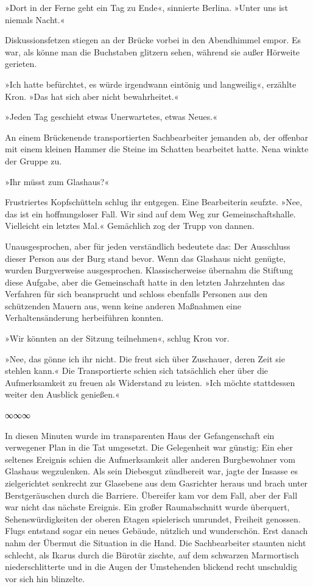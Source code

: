 »Dort in der Ferne geht ein Tag zu Ende«, sinnierte Berlina. »Unter uns ist niemals Nacht.«

Diskussionsfetzen stiegen an der Brücke vorbei in den Abendhimmel empor. Es war, als könne man die Buchstaben glitzern sehen, während sie außer Hörweite gerieten.

»Ich hatte befürchtet, es würde irgendwann eintönig und langweilig«, erzählte Kron. »Das hat sich aber nicht bewahrheitet.«

»Jeden Tag geschieht etwas Unerwartetes, etwas Neues.«

An einem Brückenende transportierten Sachbearbeiter jemanden ab, der offenbar mit einem kleinen Hammer die Steine im Schatten bearbeitet hatte. Nena winkte der Gruppe zu.

»Ihr müsst zum Glashaus?«

Frustriertes Kopfschütteln schlug ihr entgegen. Eine Bearbeiterin seufzte. »Nee, das ist ein hoffnungsloser Fall. Wir sind auf dem Weg zur Gemeinschaftshalle. Vielleicht ein letztes Mal.« Gemächlich zog der Trupp von dannen.

Unausgesprochen, aber für jeden verständlich bedeutete das: Der Ausschluss dieser Person aus der Burg stand bevor. Wenn das Glashaus nicht genügte, wurden Burgverweise ausgesprochen. Klassischerweise übernahm die Stiftung diese Aufgabe, aber die Gemeinschaft hatte in den letzten Jahrzehnten das Verfahren für sich beansprucht und schloss ebenfalls Personen aus den schützenden Mauern aus, wenn keine anderen Maßnahmen eine Verhaltensänderung herbeiführen konnten.

»Wir könnten an der Sitzung teilnehmen«, schlug Kron vor.

»Nee, das gönne ich ihr nicht. Die freut sich über Zuschauer, deren Zeit sie stehlen kann.« Die Transportierte schien sich tatsächlich eher über die Aufmerksamkeit zu freuen als Widerstand zu leisten. »Ich möchte stattdessen weiter den Ausblick genießen.«

\begin{center}
	∞∞∞
\end{center}

In diesen Minuten wurde im transparenten Haus der Gefangenschaft ein verwegener Plan in die Tat umgesetzt. Die Gelegenheit war günstig: Ein eher seltenes Ereignis schien die Aufmerksamkeit aller anderen Burgbewohner vom Glashaus wegzulenken. Als sein Diebesgut zündbereit war, jagte der Insasse es zielgerichtet senkrecht zur Glasebene aus dem Gasrichter heraus und brach unter Berstgeräuschen durch die Barriere. Übereifer kam vor dem Fall, aber der Fall war nicht das nächste Ereignis. Ein großer Raumabschnitt wurde überquert, Sehenswürdigkeiten der oberen Etagen spielerisch umrundet, Freiheit genossen. Flugs entstand sogar ein neues Gebäude, nützlich und wunderschön. Erst danach nahm der Übermut die Situation in die Hand. Die Sachbearbeiter staunten nicht schlecht, als Ikarus durch die Bürotür zischte, auf dem schwarzen Marmortisch niederschlitterte und in die Augen der Umstehenden blickend recht unschuldig vor sich hin blinzelte.

